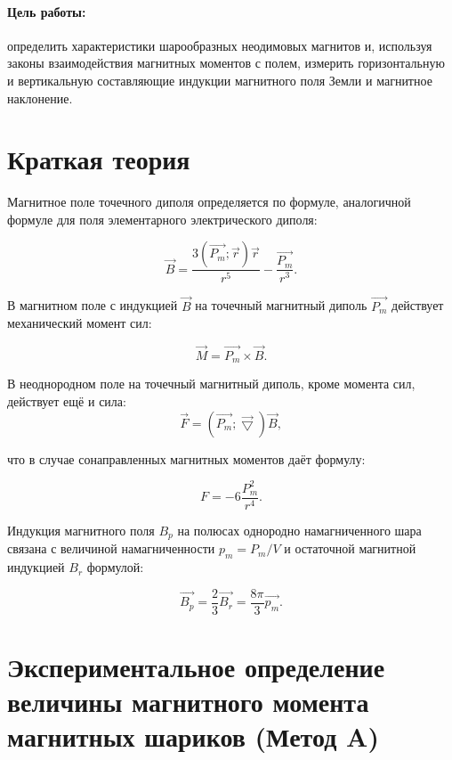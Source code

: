 \documentclass[a4paper, 14pt]{extarticle}%
\date{}
\begin{document}
\maketitle
\paragraph{Цель работы:}определить характеристики шарообразных неодимовых магнитов и, используя
законы взаимодействия магнитных моментов с полем, измерить горизонтальную и вертикальную
составляющие индукции магнитного поля Земли и магнитное наклонение.
\section{Краткая теория}

Магнитное поле точечного диполя определяется по формуле, аналогичной формуле для поля
элементарного электрического диполя:

\begin{equation}
\vec{B} = \frac{3(\vec{P_m};\vec{r})\vec{r}}{r^5}-\frac{\vec{P_m}}{r^3}.
\end{equation}

В магнитном поле с индукцией $\vec{B}$ на точечный магнитный диполь $\vec{P_m}$ действует механический момент сил:


\begin{equation}
\vec{M} = \vec{P_m} \times \vec{B}.
\end{equation}

В неоднородном поле на точечный магнитный диполь, кроме момента сил, действует ещё и сила:
\begin{equation}
\vec{F} = (\vec{P_m};\vec{\bigtriangledown})\vec{B},
\end{equation}

что в случае сонаправленных магнитных моментов даёт формулу:

\begin{equation}
F = -6\frac{P_m^2}{r^4}.
\end{equation}

Индукция магнитного поля $B_p$ на полюсах однородно намагниченного шара связана с величиной намагниченности $p_m = P_m/V$
и остаточной магнитной индукцией $B_r$
формулой:

\[\vec{B_p} = \frac{2}{3} \vec{B_r} = \frac{8\pi}{3} \vec{p_m} .\]

\section{Экспериментальное определение величины магнитного момента магнитных шариков (Метод A)}
\end{document}
